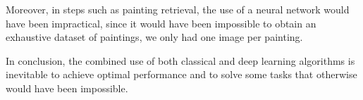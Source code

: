 Moreover, in steps such as painting retrieval, the use of a neural network would have been impractical, since it would have been impossible to obtain an exhaustive dataset of paintings, we only had one image per painting.

In conclusion, the combined use of both classical and deep learning algorithms is inevitable to achieve optimal performance and to solve some tasks that otherwise would have been impossible.
